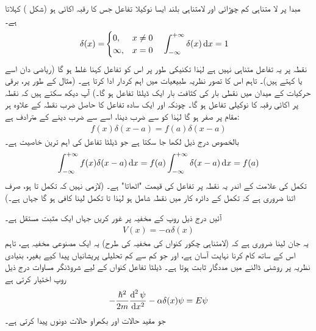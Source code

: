 مبدا پر  لا متناہی کم چوڑائی اور لامتناہی بلند ایسا نوکیلا تفاعل  جس کا رقبہ اکائی ہو  (شکل )  کہلاتا ہے۔ 
\begin{align}\label{مساوات_شروڈنگر_ڈیلٹا_تفاعل_تعریف}
\delta(x)=&
\begin{cases}
0,& x\neq 0\\
\infty, &  x=0
\end{cases}
&&
\int_{-\infty}^{+\infty}\delta(x)\dif{x}=1
\end{align} 
نقطہ    پر یہ تفاعل  متناہی نہیں ہے  لہٰذا تکنیکی طور پر اس کو تفاعل کہنا غلط ہو گا (ریاضی دان اسے  یا  کہتے ہیں)۔ تاہم اس کا تصور نظریہ طبیعیات  میں اہم کردار ادا کرتا ہے۔  (مثال کے طور پر، برقی حرکیات کے میدان میں نقطی بار کی کثافت بار ایک ڈیلٹا تفاعل ہو گا۔) آپ دیکھ سکتے ہیں کہ   نقطہ   پر اکائی رقبہ کا نوکیلی تفاعل ہو گا۔  چونکہ   اور ایک سادہ تفاعل  کا حاصل ضرب نقطہ     کے علاوہ ہر مقام پر صفر ہو گا لہٰذا  کو   سے ضرب دینا، اسے  سے ضرب دینے کے مترادف ہے:
\begin{align}
f(x)\delta(x-a)=f(a)\delta(x-a)
\end{align}
بالخصوص درج ذیل لکھا جا سکتا ہے جو  ڈیلٹا تفاعل کی اہم ترین خاصیت ہے۔ 
\begin{align}\label{مساوات_شروڈنگر_ڈیلٹا_تفاعل_اٹھاتا_ہے}
\int_{-\infty}^{+\infty}f(x)\delta(x-a)\dif{x}=f(a)\int_{-\infty}^{+\infty}\delta(x-a)\dif{x}=f(a)
\end{align}
 تکمل کی علامت کے اندر یہ نقطہ    پر تفاعل  کی قیمت "اٹھاتا" ہے۔ (لازمی نہیں کہ تکمل   تا    ہو،  صرف اتنا ضروری ہے کہ تکمل کے دائرہ کار میں نقطہ  شامل ہو لہٰذا  تا  تکمل لینا کافی ہو گا جہاں  ہے۔) 

آئیں درج ذیل روپ کے مخفیہ پر غور کریں جہاں   ایک مثبت مستقل ہے۔
\begin{align}\label{مساوات_شروڈنگر_کنواں_مخفیہ}
V(x)=-\alpha\delta(x)
\end{align}
یہ جان لینا ضروری ہے کہ (لامتناہی چکور  کنواں کی مخفیہ کی طرح) یہ ایک مصنوعی مخفیہ ہے، تاہم اس کے ساتھ کام کرنا نہایت آسان  ہے، اور جو کم سے کم  تحلیلی پریشانیاں پیدا کیے بغیر،  بنیادی نظریہ پر روشنی ڈالنے میں مددگار ثابت ہوتا ہے۔  ڈیلٹا تفاعل کنواں کے لیے شروڈنگر مساوات درج ذیل روپ اختیار کرتی ہے
\begin{align}
-\frac{\hslash^{2}}{2m}\frac{\dif^{\,2}\psi}{\dif{x^{2}}}-\alpha\delta(x)\psi=E\psi
\end{align} 
جو مقید حالات   اور بکھراو حالات   دونوں پیدا کرتی ہے۔

